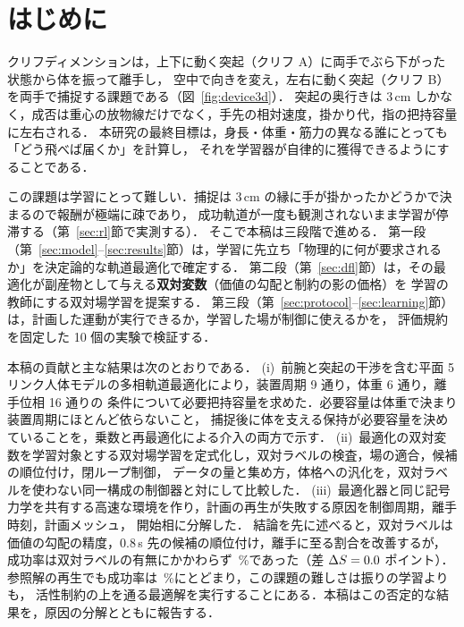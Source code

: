 \section{はじめに}
クリフディメンションは，上下に動く突起（クリフ A）に両手でぶら下がった状態から体を振って離手し，
空中で向きを変え，左右に動く突起（クリフ B）を両手で捕捉する課題である（図~\ref{fig:device3d}）．
突起の奥行きは 3\,cm しかなく，成否は重心の放物線だけでなく，手先の相対速度，掛かり代，指の把持容量に左右される．
本研究の最終目標は，身長・体重・筋力の異なる誰にとっても「どう飛べば届くか」を計算し，
それを学習器が自律的に獲得できるようにすることである．

この課題は学習にとって難しい．捕捉は 3\,cm の縁に手が掛かったかどうかで決まるので報酬が極端に疎であり，
成功軌道が一度も観測されないまま学習が停滞する（第~\ref{sec:rl}節で実測する）．
そこで本稿は三段階で進める．
第一段（第~\ref{sec:model}--\ref{sec:results}節）は，学習に先立ち「物理的に何が要求されるか」を決定論的な軌道最適化で確定する．
第二段（第~\ref{sec:dfl}節）は，その最適化が副産物として与える\textbf{双対変数}（価値の勾配と制約の影の価格）を
学習の教師にする双対場学習を提案する．
第三段（第~\ref{sec:protocol}--\ref{sec:learning}節）は，計画した運動が実行できるか，学習した場が制御に使えるかを，
評価規約を固定した 10 個の実験で検証する．

本稿の貢献と主な結果は次のとおりである．
(i)~前腕と突起の干渉を含む平面 5 リンク人体モデルの多相軌道最適化により，装置周期 9 通り，体重 6 通り，離手位相 16 通りの
\gridN 条件について必要把持容量を求めた．必要容量は体重で決まり装置周期にほとんど依らないこと，
捕捉後に体を支える保持が必要容量を決めていることを，乗数と再最適化による介入の両方で示す．
(ii)~最適化の双対変数を学習対象とする双対場学習を定式化し，双対ラベルの検査，場の適合，候補の順位付け，閉ループ制御，
データの量と集め方，体格への汎化を，双対ラベルを使わない同一構成の制御器と対にして比較した．
(iii)~最適化器と同じ記号力学を共有する高速な環境を作り，計画の再生が失敗する原因を制御周期，離手時刻，計画メッシュ，
開始相に分解した．
結論を先に述べると，双対ラベルは価値の勾配の精度，0.8\,s 先の候補の順位付け，離手に至る割合を改善するが，
成功率は双対ラベルの有無にかかわらず \clSmpcSuccInt\,\%であった（差 $\Delta S=0.0$ ポイント）．
参照解の再生でも成功率は \clReplaySuccInt\,\%にとどまり，この課題の難しさは振りの学習よりも，
活性制約の上を通る最適解を実行することにある．本稿はこの否定的な結果を，原因の分解とともに報告する．
